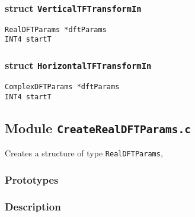 \subsubsection*{struct \texttt{VerticalTFTransformIn}}

\noindent 

\begin{description}
\item[\texttt{RealDFTParams  *dftParams}]
\item[\texttt{INT4  startT}]
\end{description}

\subsubsection*{struct \texttt{HorizontalTFTransformIn}}

\noindent 

\begin{description}
\item[\texttt{ComplexDFTParams  *dftParams}]
\item[\texttt{INT4  startT}]
\end{description}

\newpage
\subsection{Module \texttt{CreateRealDFTParams.c}}
\label{ss:CreateRealDFTParams.c}

Creates a structure of type \verb+RealDFTParams+,

\subsubsection*{Prototypes}
\vspace{0.1in}


\subsubsection*{Description}

